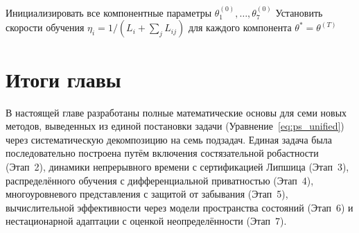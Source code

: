 \begin{algorithm}[htbp]
\caption{Единая система: поочерёдная оптимизация со связкой согласованности}\label{alg:unified}
Инициализировать все компонентные параметры $\theta_1^{(0)},\ldots,\theta_7^{(0)}$\;
Установить скорости обучения $\eta_i = 1/(L_i + \sum_j L_{ij})$ для каждого компонента\;
\Return $\theta^* = \theta^{(T)}$
\end{algorithm}


\section{Итоги главы}
\label{sec:ch2_summary}

В настоящей главе разработаны полные математические основы для семи новых методов, выведенных из единой постановки задачи (Уравнение~\eqref{eq:ps_unified}) через систематическую декомпозицию на семь подзадач. Единая задача была последовательно построена путём включения состязательной робастности (Этап~2), динамики непрерывного времени с сертификацией Липшица (Этап~3), распределённого обучения с дифференциальной приватностью (Этап~4), многоуровневого представления с защитой от забывания (Этап~5), вычислительной эффективности через модели пространства состояний (Этап~6) и нестационарной адаптации с оценкой неопределённости (Этап~7).

